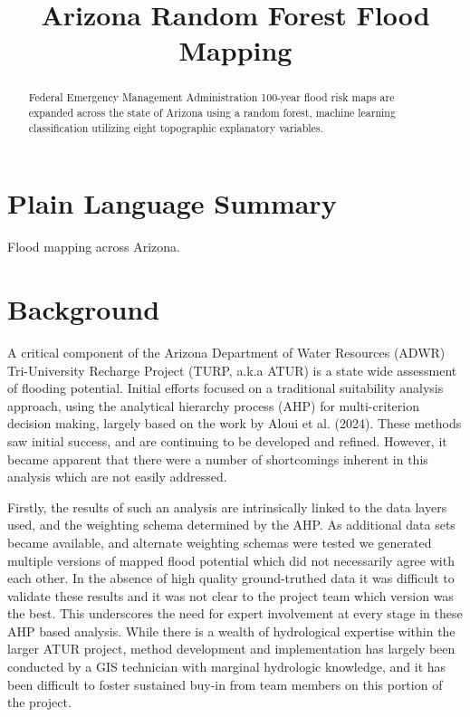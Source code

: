 \documentclass[
]{agujournal2019}
\begin{document}
\title{Arizona Random Forest Flood Mapping}



\begin{abstract}
Federal Emergency Management Administration 100-year flood risk maps are
expanded across the state of Arizona using a random forest, machine
learning classification utilizing eight topographic explanatory
variables.
\end{abstract}

\section*{Plain Language Summary}
Flood mapping across Arizona.




\section{Background}\label{background}

A critical component of the Arizona Department of Water Resources (ADWR)
Tri-University Recharge Project (TURP, a.k.a ATUR) is a state wide
assessment of flooding potential. Initial efforts focused on a
traditional suitability analysis approach, using the analytical
hierarchy process (AHP) for multi-criterion decision making, largely
based on the work by Aloui et al. (2024). These methods saw initial
success, and are continuing to be developed and refined. However, it
became apparent that there were a number of shortcomings inherent in
this analysis which are not easily addressed.

Firstly, the results of such an analysis are intrinsically linked to the
data layers used, and the weighting schema determined by the AHP. As
additional data sets became available, and alternate weighting schemas
were tested we generated multiple versions of mapped flood potential
which did not necessarily agree with each other. In the absence of high
quality ground-truthed data it was difficult to validate these results
and it was not clear to the project team which version was the best.
This underscores the need for expert involvement at every stage in these
AHP based analysis. While there is a wealth of hydrological expertise
within the larger ATUR project, method development and implementation
has largely been conducted by a GIS technician with marginal hydrologic
knowledge, and it has been difficult to foster sustained buy-in from
team members on this portion of the project.
\end{document}
